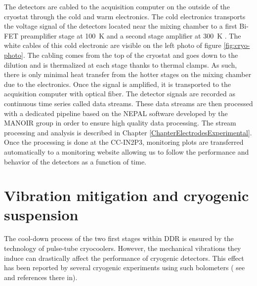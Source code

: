 The detectors are cabled to the acquisition computer on the outside of the cryostat through the cold and warm electronics. The cold electronics transports the voltage signal of the detectors located near the mixing chamber to a first Bi-FET preamplifier stage at \SI{100}{\kelvin} and a second stage amplifier at \SI{300}{\kelvin} \cite{Armengaud:2017rzu}.
The white cables of this cold electronic are visible on the left photo of figure \ref{fig:cryo-photo}. The cabling comes from the top of the cryostat and goes down to the dilution and is thermalized at each stage thanks to thermal clamps. As such, there is only minimal heat transfer from the hotter stages  on the mixing chamber due to the electronics.
Once the signal is amplified, it is transported to the acquisition computer with optical fiber. The detector signals are recorded as continuous time series called data streams. These data streams are then processed with a dedicated pipeline based on the NEPAL software developed by the MANOIR group in order to ensure high quality data processing. The stream processing and analysis is described in Chapter \ref{ChapterElectrodesExperimental}. Once the processing is done at the CC-IN2P3, monitoring plots are transferred automatically to a monitoring website allowing us to follow the performance and behavior of the detectors as a function of time.



\section{Vibration mitigation and cryogenic suspension}
\label{sec:suspended-tower}
\label{par:suspended-tower}

The cool-down process of the two first stages within DDR is ensured by the technology of pulse-tube cryocoolers. However, the mechanical vibrations they induce can drastically affect the performance of cryogenic detectors. This effect has been reported by several cryogenic experiments using such bolometers ( see \cite{Maisonobe:2018tbq} and references there in).

